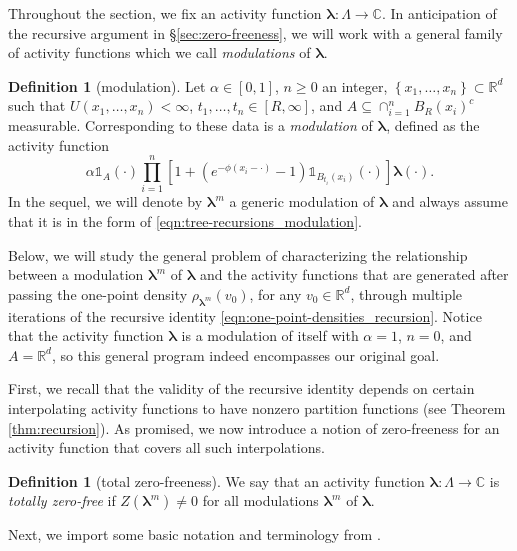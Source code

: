 \documentclass[11pt]{article}
\newcommand{\R}{\mathbb R}
\newcommand{\C}{\mathbb C}
\newcommand{\bl}{\bm{\lambda}}
\newcommand{\hcconst}{R}
\newcommand{\set}[1]{\left\{#1\right\}}
\newcommand{\indicator}[1]{\mathds{1}_{#1}}
\numberwithin{equation}{section}
\theoremstyle{plain}
\theoremstyle{definition}
\newtheorem{definition}[theorem]{Definition}
\theoremstyle{remark}
\begin{document}
Throughout the section, we fix an activity function $\bl:\Lambda\rightarrow\C$.
In anticipation of the recursive argument in \S\ref{sec:zero-freeness}, we will work with a general family of activity functions which we call \emph{modulations} of $\bl$.

\begin{definition}[modulation]
\label{def:tree-recursions_modulation}
Let $\alpha\in[0,1]$, $n\ge 0$ an integer, $\set{x_{1},\dots,x_{n}}\subset\R^{d}$ such that $U(x_{1},\dots,x_{n})<\infty$, $t_{1},\dots,t_{n}\in[\hcconst,\infty]$, and $A\subseteq\cap_{i=1}^{n}B_{\hcconst}(x_{i})^{c}$ measurable.
Corresponding to these data is a \emph{modulation} of $\bl$, defined as the activity function
\begin{equation}
\label{eqn:tree-recursions_modulation}
\alpha\indicator{A}(\cdot)\prod_{i=1}^{n}\left[1+(e^{-\phi(x_{i}-\cdot)}-1)\indicator{B_{t_{i}}(x_{i})}(\cdot)\right]\bl(\cdot).
\end{equation}
In the sequel, we will denote by $\bl^{m}$ a generic modulation of $\bl$ and always assume that it is in the form of \eqref{eqn:tree-recursions_modulation}.
\end{definition}

Below, we will study the general problem of characterizing the relationship between a modulation $\bl^{m}$ of $\bl$ and the activity functions that are generated after passing the one-point density $\rho_{\bl^{m}}(v_{0})$, for any $v_{0}\in\R^{d}$, through multiple iterations of the recursive identity \eqref{eqn:one-point-densities_recursion}.
Notice that the activity function $\bl$ is a modulation of itself with $\alpha=1$, $n=0$, and $A=\R^{d}$, so this general program indeed encompasses our original goal.

First, we recall that the validity of the recursive identity depends on certain interpolating activity functions to have nonzero partition functions (see Theorem \ref{thm:recursion}).
As promised, we now introduce a notion of zero-freeness for an activity function that covers all such interpolations.

\begin{definition}[total zero-freeness]
\label{def:tree-recursions_totally-zero-free}
We say that an activity function $\bl:\Lambda\rightarrow\C$ is \emph{totally zero-free} if $Z(\bl^{m})\ne 0$ for all modulations $\bl^{m}$ of $\bl$.
\end{definition}

Next, we import some basic notation and terminology from \cite[\S4.1]{michelen2023analyticity}.
\end{document}
